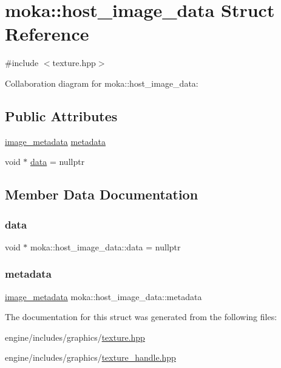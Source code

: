 \hypertarget{structmoka_1_1host__image__data}{}\section{moka\+::host\+\_\+image\+\_\+data Struct Reference}
\label{structmoka_1_1host__image__data}


{\ttfamily \#include $<$texture.\+hpp$>$}



Collaboration diagram for moka\+::host\+\_\+image\+\_\+data\+:
\subsection*{Public Attributes}
\begin{DoxyCompactItemize}
\item 
\mbox{\hyperlink{structmoka_1_1image__metadata}{image\+\_\+metadata}} \mbox{\hyperlink{structmoka_1_1host__image__data_a4c0fd6faf3b62bcea2daf726c633b36f}{metadata}}
\item 
void $\ast$ \mbox{\hyperlink{structmoka_1_1host__image__data_aeb16a9b629e48dd2d0f1b612c1427346}{data}} = nullptr
\end{DoxyCompactItemize}


\subsection{Member Data Documentation}
\mbox{\label{structmoka_1_1host__image__data_aeb16a9b629e48dd2d0f1b612c1427346}} 
\subsubsection{\texorpdfstring{data}{data}}
{\footnotesize\ttfamily void $\ast$ moka\+::host\+\_\+image\+\_\+data\+::data = nullptr}

\mbox{\label{structmoka_1_1host__image__data_a4c0fd6faf3b62bcea2daf726c633b36f}} 
\subsubsection{\texorpdfstring{metadata}{metadata}}
{\footnotesize\ttfamily \mbox{\hyperlink{structmoka_1_1image__metadata}{image\+\_\+metadata}} moka\+::host\+\_\+image\+\_\+data\+::metadata}



The documentation for this struct was generated from the following files\+:\begin{DoxyCompactItemize}
\item 
engine/includes/graphics/\mbox{\hyperlink{texture_8hpp}{texture.\+hpp}}\item 
engine/includes/graphics/\mbox{\hyperlink{texture__handle_8hpp}{texture\+\_\+handle.\+hpp}}\end{DoxyCompactItemize}

